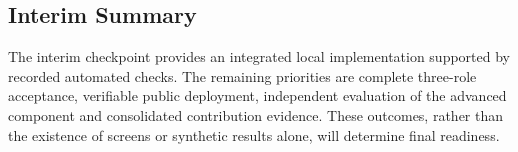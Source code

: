 \subsection{Interim Summary}
The interim checkpoint provides an integrated local implementation supported
by recorded automated checks. The remaining priorities are complete
three-role acceptance, verifiable public deployment, independent evaluation
of the advanced component and consolidated contribution evidence. These
outcomes, rather than the existence of screens or synthetic results alone,
will determine final readiness.
